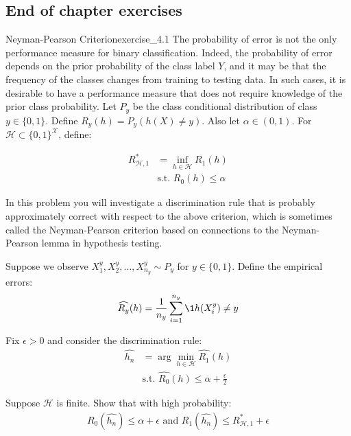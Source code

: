 \subsection{End of chapter exercises}
\begin{exercise}{Neyman-Pearson Criterion}{exercise_4.1}
    The probability of error is not the only performance measure for binary classification. Indeed, the
    probability of error depends on the prior probability of the class label $Y$, and it may be that the
    frequency of the classes changes from training to testing data. In such cases, it is desirable to have a performance measure that does not require knowledge of the prior class probability. Let $P_y$ be the class conditional distribution of class $y\in\{0,1\}$. Define $R_y(h)=P_y(h(X) \ne y)$. Also let $\alpha \in (0,1)$. For $\mathcal{H}\subset\{0,1\}^{\mathcal{X}}$, define:

    \begin{align*}
        R^*_{\mathcal{H}, 1} &= \inf_{h\in\mathcal{H}} R_1(h) \\
        &\text{s.t. } R_0(h) \le \alpha 
    \end{align*}

    In this problem you will investigate a discrimination rule that is probably approximately correct with respect to the above criterion, which is sometimes called the Neyman-Pearson criterion based on connections to the Neyman-Pearson lemma in hypothesis testing.

    \noindent Suppose we observe $X_1^y, X_2^y, \dots, X_{n_y}^y \sim P_y$ for $y\in\{0,1\}$. Define the empirical errors:
    \begin{align*}
        \widehat{R_y}(h) = \frac{1}{n_y} \sum_{i=1}^{n_y} \1{h(X_i^y) \ne y}
    \end{align*}

    Fix $\epsilon > 0$ and consider the discrimination rule:
    \begin{align*}
        \widehat{h_n} &= \arg\min_{h\in\mathcal{H}} \widehat{R_1}(h) \\
        &\text{s.t. } \widehat{R_0}(h) \le \alpha + \frac{\epsilon}{2} 
    \end{align*}

    Suppose $\mathcal{H}$ is finite. Show that with high probability:
    \begin{align*}
        R_0(\widehat{h_n}) \le \alpha + \epsilon \text{ and } R_1(\widehat{h_n}) \le R^*_{\mathcal{H}, 1} + \epsilon
    \end{align*}
\end{exercise}

